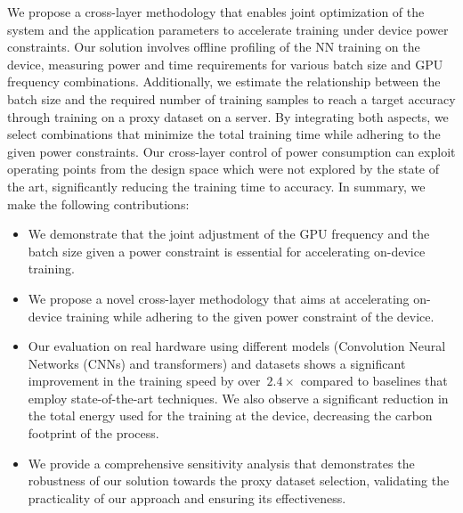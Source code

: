 We propose a cross-layer methodology that enables joint optimization of the system and the application parameters to accelerate training under device power constraints. Our solution involves offline profiling of the \ac{NN} training on the device, measuring power and time requirements for various batch size and GPU frequency combinations. Additionally, we estimate the relationship between the batch size and the required number of training samples to reach a target accuracy through training on a proxy dataset on a server. By integrating both aspects, we select combinations that minimize the total training time while adhering to the given power constraints. Our cross-layer control of power consumption can exploit operating points from the design space which were not explored by the state of the art, significantly reducing the training time to accuracy. 
 In summary, we make the following contributions:
\begin{itemize}
    \item We demonstrate that the joint adjustment of the GPU frequency and the batch size given a power constraint is essential for accelerating on-device training.
    \item We propose a novel cross-layer methodology that aims at accelerating on-device training while adhering to the given power constraint of the device.
    \item Our evaluation on real hardware using different models (Convolution Neural Networks (CNNs) and transformers) and datasets shows a significant improvement in the training speed by over~$2.4\times$ compared to baselines that employ state-of-the-art techniques. We also observe a significant reduction in the total energy used for the training at the device, decreasing the carbon footprint of the process.  
    \item We provide a comprehensive sensitivity analysis that demonstrates the robustness of our solution towards the proxy dataset selection, validating the practicality of our approach and ensuring its effectiveness.
\end{itemize}